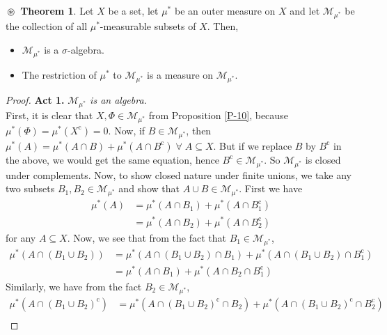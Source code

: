 \documentclass{article}
\theoremstyle{definition}
\newtheorem{theorem}{$\boxed{\boxed{\circledast}}$ Theorem}
\theoremstyle{remark}
\theoremstyle{definition}
\theoremstyle{definition}
\theoremstyle{definition}
\newcommand{\union}{\cup}
\newcommand{\intrs}{\cap}
\newcommand{\comp}[1]{#1^{\text{c}}}
\newcommand{\om}[1]{\mu^*\left ( #1\right )}
\newcommand{\set}[1]{\mathscr{#1}}
\newcommand{\msigm}[1]{\set{M}_{#1}}
\begin{document}
\begin{theorem}
	\label{T-1}
	Let $ X $ be a set, let $ \mu^* $ be an outer measure on $ X $ and let $ \set{M}_{\mu^*} $ be the collection of all $ \mu^* $-measurable subsets of $ X $. Then,
	\begin{itemize}
		\item {$ \set{M}_{\mu^*} $ is a $ \sigma $-algebra.}
		\item {The restriction of $ \mu^* $ to $ \set{M}_{\mu^*} $ is a measure on $ \set{M}_{\mu^*} $.}
	\end{itemize}
\end{theorem}
\begin{proof}
	\textbf{Act 1.} \emph{$ \msigm{\mu^*} $ is an algebra.}\\
		First, it is clear that $ X,\Phi\in \msigm{\mu^*} $ from Proposition \ref{P-10}, because $ \om{\Phi} = \om{\comp{X}} = 0 $. Now, if $ B\in \msigm{\mu^*} $, then $ \om{A} = \om{A\intrs B} + \om{A\intrs \comp{B}} \;\forall\;A\subseteq X$. But if we replace $ B $ by $ \comp{B} $ in the above, we would get the same equation, hence $ \comp{B} \in \msigm{\mu^*} $. So $ \msigm{\mu^*} $ is closed under complements. Now, to show closed nature under finite unions, we take any two subsets $ B_1, B_2\in \msigm{\mu^*} $ and show that $ A\union B\in \msigm{\mu^*} $. First we have
		\begin{equation*}
			\begin{split}
				\om{A} &= \om{A\intrs B_1} + \om{A\intrs \comp{B_1}}\\
				&= \om{A\intrs B_2} + \om{A\intrs \comp{B_2}}
			\end{split}
		\end{equation*}
	for any $ A\subseteq X $. Now, we see that from the fact that $ B_1\in \msigm{\mu^*} $,
	\begin{equation*}
		\begin{split}
			\om{A\intrs (B_1\union B_2)} &= \om{A\intrs (B_1\union B_2) \intrs B_1} +\om{A\intrs (B_1\union B_2) \intrs \comp{B_1}} \\
			&= \om{A\intrs B_1} + \om{A\intrs B_2 \intrs \comp{B_1}}
		\end{split}
	\end{equation*}
Similarly, we have from the fact $ B_2\in\msigm{\mu^*} $,
\begin{equation*}
	\begin{split}
		\om{A\intrs \comp{(B_1\union B_2)}} &= \om{A\intrs \comp{(B_1 \union B_2)} \intrs B_2} + \om{A\intrs \comp{(B_1 \union B_2)} \intrs \comp{B_2}}\\

\end{split}
\end{equation*}
\end{proof}
\end{document}
